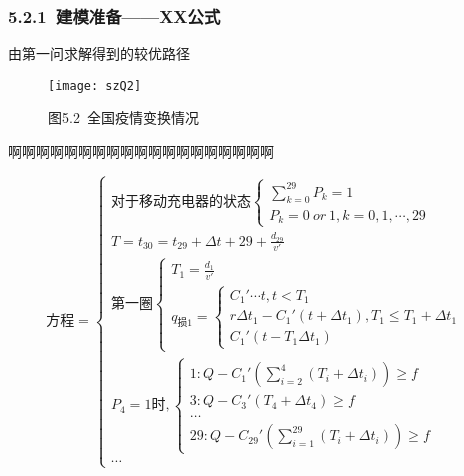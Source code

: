 \documentclass[12pt,a4paper]{article}
\begin{document}
\subsubsection*{5.2.1\ 建模准备——XX公式}
\begin{spacing}{1.0}
	\sloppy{}
	由第一问求解得到的较优路径
\end{spacing}
\begin{figure}[htbp] %
	\centering\texttt{[image: szQ2]} %
	\caption*{图5.2\ 全国疫情变换情况}
\end{figure}
\begin{spacing}{1.0}
	\sloppy{}
	啊啊啊啊啊啊啊啊啊啊啊啊啊啊啊啊啊啊啊
\end{spacing}\vspace{-0.5em}
\begin{equation}
	\mbox{方程}=
	\begin{cases}
	\mbox{对于移动充电器的状态}\begin{cases}
	\sum_{k=0}^{29}P_{k}=1\\
	P_{k}=0\ or\ 1,k=0,1,\cdots,29\end{cases}\nonumber\\
	T=t_{30}=t_{29}+\Delta t+{29}+\frac{d_{29}}{v'}\\
	\mbox{第一圈}\begin{cases}
	T_{1}=\frac{d_{1}}{v'}\\
	q_{\mbox{损}1}=\begin{cases}
	C_{1}'\cdots t,t<T_{1}\\
	r\Delta t_{1}-C_{1}'(t+\Delta t_{1}),T_{1}\leq T_{1}+\Delta t_{1}\\
	C_{1}'(t-T_{1}\Delta t_{1})                       
	\end{cases}\nonumber\end{cases}\nonumber\\
	P_{4}=1\mbox{时},\begin{cases}
	1:Q-C_{1}'(\sum_{i=2}^{4}(T_{i}+\Delta t_{i}))\geq f\\
	3:Q-C_{3}'(T_{4}+\Delta t_{4})\geq f\\
	\ldots\\
	29:Q-C_{29}'(\sum_{i=1}^{29}(T_{i}+\Delta t_{i}))\geq f
	\end{cases}\nonumber\\
	\cdots
	\end{cases}
\end{equation}
\end{document}
